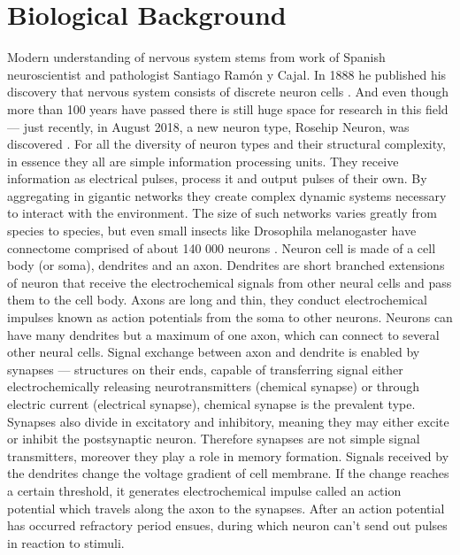 \section{Biological Background}
Modern understanding of nervous system stems from work of Spanish neuroscientist and pathologist Santiago Ramón y Cajal. In 1888 he published his discovery that nervous system consists of discrete neuron cells \cite{29}. And even though more than 100 years have passed there is still huge space for research in this field — just recently, in August 2018, a new neuron type, Rosehip Neuron, was discovered \cite{30}.
For all the diversity of neuron types and their structural complexity, in essence they all are simple information processing units. They receive information as electrical pulses, process it and output pulses of their own. By aggregating in gigantic networks they create complex dynamic systems necessary to interact with the environment. The size of such networks varies greatly from species to species, but even small insects like Drosophila melanogaster have connectome comprised of about 140 000 neurons \cite{31}.
Neuron cell is made of a cell body (or soma), dendrites and an axon. Dendrites are short branched extensions of neuron that receive the electrochemical signals from other neural cells and pass them to the cell body. Axons are long and thin, they conduct electrochemical impulses known as action potentials from the soma to other neurons. Neurons can have many dendrites but a maximum of one axon, which can connect to several other neural cells. Signal exchange between axon and dendrite is enabled by synapses — structures on their ends, capable of transferring signal either electrochemically releasing neurotransmitters (chemical synapse) or through electric current (electrical synapse), chemical synapse is the prevalent type. Synapses also divide in excitatory and inhibitory, meaning they may either excite or inhibit the postsynaptic neuron. Therefore synapses are not simple signal transmitters, moreover they play a role in memory formation.
Signals received by the dendrites change the voltage gradient of cell membrane. If the change reaches a certain threshold, it generates electrochemical impulse called an action potential which travels along the axon to the synapses. After an action potential has occurred refractory period ensues, during which neuron can't send out pulses in reaction to stimuli.


